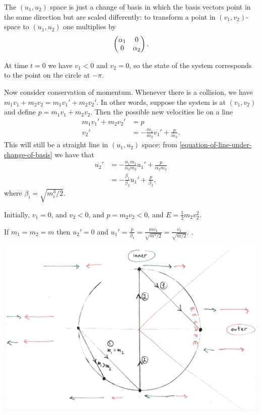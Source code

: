 The $(u_1, u_2)$ space is just a change of basis in which the basis vectors point in the same
direction but are scaled differently: to transform a point in $(v_1, v_2)$-space to $(u_1, u_2)$ one
multiplies by
\begin{align*}
 \begin{pmatrix}\alpha_1 & 0\\0 & \alpha_2\\ \end{pmatrix}.
\end{align*}

At time $t=0$ we have $v_1 < 0$ and $v_2 = 0$, so the state of the system corresponds to the point
on the circle at $-\pi$.

Now consider conservation of momentum. Whenever there is a collision, we have
$m_1v_1 + m_2v_2 = m_1v_1' + m_2v_2'$. In other words, suppose the system is at $(v_1, v_2)$ and
define $p = m_1v_1 + m_2v_2$. Then the possible new velocities lie on a line
\begin{align*}
  m_1v_1' + m_2v_2' &= p \\
  v_2'              &= -\frac{m_1}{m_2}v_1' + \frac{p}{m_2}.
\end{align*}
This will still be a straight line in $(u_1, u_2)$ space: from
\ref{equation-of-line-under-change-of-basis} we have that
\begin{align*}
  u_2'
  &= -\frac{\alpha_1m_1}{\alpha_2m_2}u_1' + \frac{p}{\alpha_2m_2} \\
  &= -\frac{\beta_1}{\beta_2}u_1' + \frac{p}{\beta_2},
\end{align*}
where $\beta_i = \sqrt{m_i^3/2}$.

Initially, $v_1 = 0$, and $v_2 < 0$, and $p = m_2v_2 < 0$, and $E = \frac{1}{2}m_2v_2^2$.

If $m_1 = m_2 = m$ then $u_2' = 0$ and
$u_1' = \frac{p}{\beta_1} = \frac{mv_2}{\sqrt{m^3/2}} = \frac{v_2}{\sqrt{m/2}}$. .

\begin{mdframed}
  \includegraphics[width=400pt]{img/3blue1brown--pi-colliding-blocks-1.png}
\end{mdframed}


